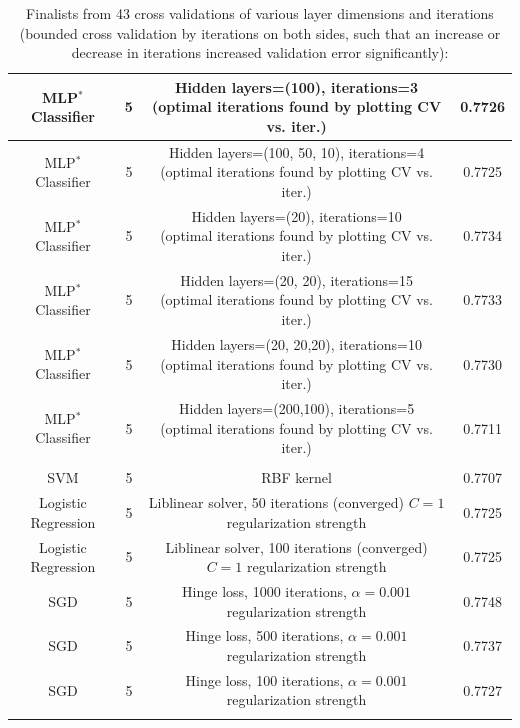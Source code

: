 \begin{longtable}{c|c|c|c}
MLP$^{*}$ Classifier & 5 & \makecell*{Hidden layers=(100), iterations=3 \\ (optimal iterations found by plotting CV vs. iter.)} & 0.7726 \\\hline
MLP$^{*}$ Classifier & 5 & \makecell*{Hidden layers=(100, 50, 10), iterations=4 \\ (optimal iterations found by plotting CV vs. iter.)} & 0.7725 \\\hline
MLP$^{*}$ Classifier & 5 & \makecell*{Hidden layers=(20), iterations=10 \\ (optimal iterations found by plotting CV vs. iter.)} & 0.7734 \\\hline
MLP$^{*}$ Classifier & 5 & \makecell*{Hidden layers=(20, 20), iterations=15 \\ (optimal iterations found by plotting CV vs. iter.)} & 0.7733 \\\hline
MLP$^{*}$ Classifier & 5 & \makecell*{Hidden layers=(20, 20,20), iterations=10 \\ (optimal iterations found by plotting CV vs. iter.)} & 0.7730 \\\hline
MLP$^{*}$ Classifier & 5 & \makecell*{Hidden layers=(200,100), iterations=5 \\ (optimal iterations found by plotting CV vs. iter.)} & 0.7711 \\\hline
\caption{Without data normalization, with de-categorization of data}\\\hline
SVM & 5 & RBF kernel & 0.7707 \\\hline
Logistic Regression & 5 & \makecell*{Liblinear solver, 50 iterations (converged) \\ $C=1$ regularization strength} & 0.7725 \\\hline
Logistic Regression & 5 & \makecell*{Liblinear solver, 100 iterations (converged)\\ $C=1$ regularization strength} & 0.7725 \\\hline
SGD & 5 & \makecell*{Hinge loss, 1000 iterations,\\ $\alpha=0.001$ regularization strength} & 0.7748 \\\hline
SGD & 5 & \makecell*{Hinge loss, 500 iterations,\\ $\alpha=0.001$ regularization strength} & 0.7737 \\\hline
SGD & 5 & \makecell*{Hinge loss, 100 iterations,\\ $\alpha=0.001$ regularization strength} & 0.7727 \\\hline
\caption{Finalists from 43 cross validations of various layer dimensions and iterations (bounded cross validation by iterations on both sides, such that an increase or decrease in iterations increased validation error significantly):}\\\hline

\end{longtable}
